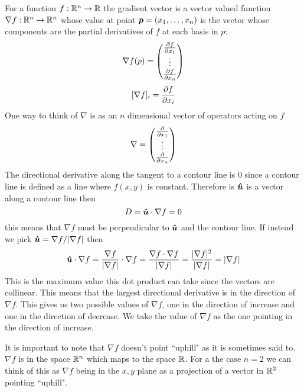 \documentclass{article}
\renewcommand{\grad}{\nabla}
\begin{document}
    For a function \(f:\mathbb{R}^n\to \mathbb{R}\) the gradient vector is a vector valued function \(\grad f:\bb R^n\to \bb R^n\) whose value at point \(\bm{p} = (x_1,\dotsc,x_n)\) is the vector whose components are the partial derivatives of \(f\) at each basis in \(p\):
    \[
        \grad f(p) = 
        \begin{pmatrix}
            \pdv{f}{x_1}(p) \\ \vdots \\ \pdv{f}{x_n}(p)
        \end{pmatrix}
    \]
    \[[\grad f]_i = \pdv{f}{x_i}\]
    One way to think of \(\grad\) is as an \(n\) dimensional vector of operators acting on \(f\)
    \[
        \grad = 
        \begin{pmatrix}
            \pdv{x_1} \\ \vdots \\ \pdv{x_n}
        \end{pmatrix}
    \]
    The directional derivative along the tangent to a contour line is 0 since a contour line is defined as a line where \(f(x, y)\) is constant.
    Therefore is \(\bm{\hat{u}}\) is a vector along a contour line then
    \[D = \vh u\cdot\grad f = 0\]
    this means that \(\grad f\) must be perpendicular to \(\bm{\hat{u}}\) and the contour line.
    If instead we pick \(\vh u = \grad f/|\grad f|\) then
    \[\vh u\cdot\grad f = \frac{\grad f}{|\grad f|}\cdot \grad f = \frac{\grad f\cdot \grad f}{|\grad f|} = \frac{|\grad f|^2}{|\grad f|} = |\grad{f}|\]
    This is the maximum value this dot product can take since the vectors are collinear.
    This means that the largest directional derivative is in the direction of \(\grad f\).
    This gives us two possible values of \(\grad f\), one in the direction of increase and one in the direction of decrease.
    We take the value of \(\grad f\) as the one pointing in the direction of increase.
    
    It is important to note that \(\grad f\) doesn't point ``uphill" as it is sometimes said to.
    \(\grad f\) is in the space \(\mathbb{R}^n\) which maps to the space \(\mathbb{R}\).
    For a the case \(n = 2\) we can think of this as \(\grad f\) being in the \(x, y\) plane as a projection of a vector in \(\mathbb{R}^3\) pointing ``uphill".
    
\end{document}

